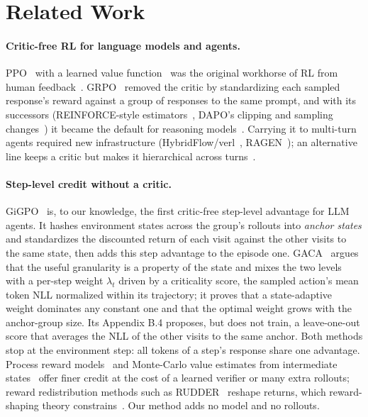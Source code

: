 \section{Related Work}
\label{sec:related}

\paragraph{Critic-free RL for language models and agents.}
PPO~\cite{schulman2017ppo} with a learned value function~\cite{schulman2015gae} was the original
workhorse of RL from human feedback~\cite{ouyang2022instructgpt}. GRPO~\cite{shao2024deepseekmath}
removed the critic by standardizing each sampled response's reward against a group of responses to
the same prompt, and with its successors (REINFORCE-style
estimators~\cite{ahmadian2024back}, DAPO's clipping and sampling changes~\cite{yu2025dapo}) it became
the default for reasoning models~\cite{guo2025deepseekr1}. Carrying it to multi-turn agents required
new infrastructure (HybridFlow/verl~\cite{sheng2025hybridflow}, RAGEN~\cite{wang2025ragen}); an
alternative line keeps a critic but makes it hierarchical across turns~\cite{zhou2024archer}.

\paragraph{Step-level credit without a critic.}
GiGPO~\cite{feng2025gigpo} is, to our knowledge, the first critic-free step-level advantage for LLM
agents. It hashes environment states across the group's rollouts into \emph{anchor states} and
standardizes the discounted return of each visit against the other visits to the same state, then
adds this step advantage to the episode one. GACA~\cite{liang2026gaca} argues that the useful
granularity is a property of the state and mixes the two levels with a per-step weight $\lambda_t$
driven by a criticality score, the sampled action's mean token NLL normalized within its trajectory;
it proves that a state-adaptive weight dominates any constant one and that the optimal weight grows
with the anchor-group size. Its Appendix B.4 proposes, but does not train, a leave-one-out score that
averages the NLL of the other visits to the same anchor. Both methods stop at the environment step: all
tokens of a step's response share one advantage. Process reward models~\cite{lightman2024verify,
wang2024mathshepherd} and Monte-Carlo value estimates from intermediate states~\cite{kazemnejad2024vineppo}
offer finer credit at the cost of a learned verifier or many extra rollouts; reward redistribution
methods such as RUDDER~\cite{arjona2019rudder} reshape returns, which reward-shaping theory
constrains~\cite{ng1999shaping}. Our method adds no model and no rollouts.

